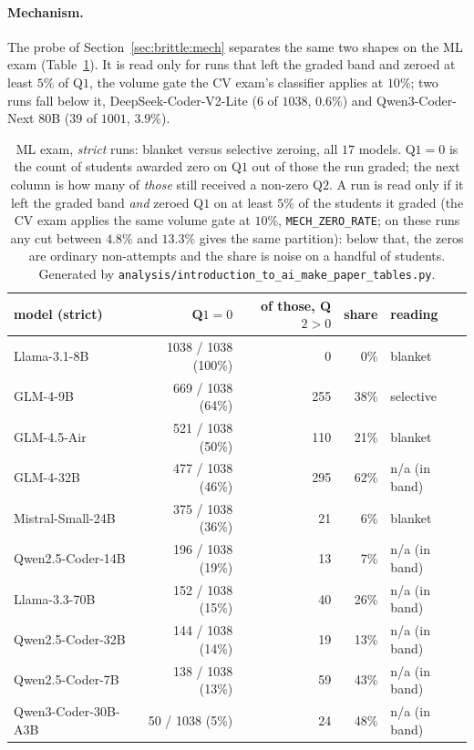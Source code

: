 \paragraph{Mechanism.}
The probe of Section~\ref{sec:brittle:mech} separates the same two shapes on the ML exam (Table~\ref{tab:repmech}). It is read only for runs that left the graded band and zeroed at least $5\%$ of Q$1$, the volume gate the CV exam's classifier applies at $10\%$; two runs fall below it, DeepSeek-Coder-V2-Lite ($6$ of $1038$, $0.6\%$) and Qwen3-Coder-Next $80$B ($39$ of $1001$, $3.9\%$).

\begin{table}[h]
\centering
\caption{ML exam, \emph{strict} runs: blanket versus selective zeroing, all $17$ models. Q$1 = 0$ is the count of students awarded zero on Q$1$ out of those the run graded; the next column is how many of \emph{those} still received a non-zero Q$2$. A run is read only if it left the graded band \emph{and} zeroed Q$1$ on at least $5\%$ of the students it graded (the CV exam applies the same volume gate at $10\%$, \texttt{MECH\_ZERO\_RATE}; on these runs any cut between $4.8\%$ and $13.3\%$ gives the same partition): below that, the zeros are ordinary non-attempts and the share is noise on a handful of students. Generated by \texttt{analysis/introduction\_to\_ai\_make\_paper\_tables.py}.}
\label{tab:repmech}
\small
\begin{tabular}{lrrrl}
\toprule
model (strict) & Q$1 = 0$ & of those, Q$2 > 0$ & share & reading \\
\midrule
Llama-3.1-8B & 1038 / 1038 (100\%) & 0 & 0\% & blanket \\
GLM-4-9B & 669 / 1038 (64\%) & 255 & 38\% & selective \\
GLM-4.5-Air & 521 / 1038 (50\%) & 110 & 21\% & blanket \\
GLM-4-32B & 477 / 1038 (46\%) & 295 & 62\% & n/a (in band) \\
Mistral-Small-24B & 375 / 1038 (36\%) & 21 & 6\% & blanket \\
Qwen2.5-Coder-14B & 196 / 1038 (19\%) & 13 & 7\% & n/a (in band) \\
Llama-3.3-70B & 152 / 1038 (15\%) & 40 & 26\% & n/a (in band) \\
Qwen2.5-Coder-32B & 144 / 1038 (14\%) & 19 & 13\% & n/a (in band) \\
Qwen2.5-Coder-7B & 138 / 1038 (13\%) & 59 & 43\% & n/a (in band) \\
Qwen3-Coder-30B-A3B & 50 / 1038 (5\%) & 24 & 48\% & n/a (in band) \\

\end{tabular}
\end{table}
